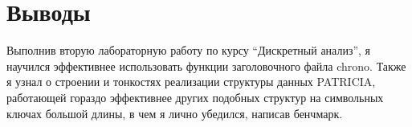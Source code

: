 \section{Выводы}
Выполнив вторую лабораторную работу по курсу \enquote{Дискретный анализ}, я научился эффективнее использовать функции заголовочного файла chrono. Также я узнал о строении и тонкостях реализации структуры данных PATRICIA, работающей гораздо эффективнее других подобных структур на символьных ключах большой длины, в чем я лично убедился, написав бенчмарк.
\pagebreak
